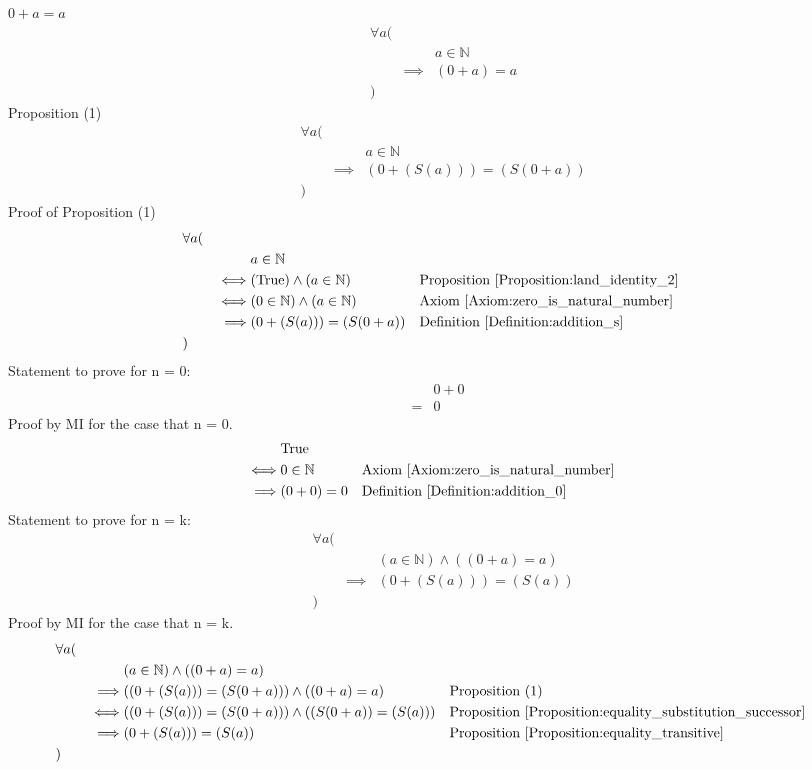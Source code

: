 \begin{prop}
\label{Proposition:zero_plus_a}
$0 + a = a$
\begin{align*}
& \forall a ( \\
& & & a \in \mathbb{N} \\
& & \implies & (0 + a) = a \\
& )
\end{align*}
Proposition (1)
\begin{align*}
& \forall a ( \\
& & & a \in \mathbb{N} \\
& & \implies & (0 + (S(a))) = (S(0 + a)) \\
& )
\end{align*}
Proof of Proposition (1)
\begin{align*}
& \forall a ( \\
& & & a \in \mathbb{N} \\
& & \iff & (\text{True}) \land (a \in \mathbb{N})
& & \text{Proposition \ref{Proposition:land_identity_2}} \\
& & \iff & (0 \in \mathbb{N}) \land (a \in \mathbb{N})
& & \text{Axiom \ref{Axiom:zero_is_natural_number}} \\
& & \implies & (0 + (S(a))) = (S(0 + a))
& & \text{Definition \ref{Definition:addition_s}} \\
& )
\end{align*}
Statement to prove for n = 0:
\begin{align*}
& 0 + 0 \\
= & 0
\end{align*}
Proof by MI for the case that n = 0.
\begin{align*}
& \text{True} \\
\iff & 0 \in \mathbb{N}
& & \text{Axiom \ref{Axiom:zero_is_natural_number}} \\
\implies & (0 + 0) = 0
& & \text{Definition \ref{Definition:addition_0}} \\
\end{align*}
Statement to prove for n = k:
\begin{align*}
& \forall a ( \\
& & & (a \in \mathbb{N}) \land ((0 + a) = a) \\
& & \implies & (0 + (S(a))) = (S(a)) \\
& )
\end{align*}
Proof by MI for the case that n = k.
\begin{align*}
& \forall a ( \\
& & & (a \in \mathbb{N}) \land ((0 + a) = a) \\
& & \implies & ((0 + (S(a))) = (S(0 + a))) \land ((0 + a) = a)
& & \text{Proposition (1)} \\
& & \iff & ((0 + (S(a))) = (S(0 + a))) \land ((S(0 + a)) = (S(a)))
& & \text{Proposition \ref{Proposition:equality_substitution_successor}} \\
& & \implies & (0 + (S(a))) = (S(a))
& & \text{Proposition \ref{Proposition:equality_transitive}} \\
& )
\end{align*}
\end{prop}

